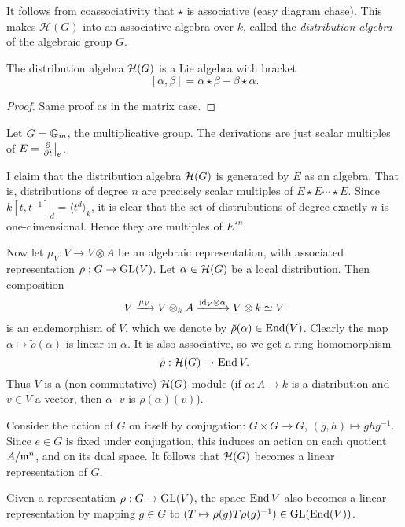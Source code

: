 \documentclass[11pt, english]{article}
\begin{document}
It follows from coassociativity that $\star$ is associative (easy diagram chase). This makes $\mathcal H(G)$ into an associative algebra over $k$, called the \emph{distribution algebra} of the algebraic group $G$.

\begin{prop}
 The distribution algebra $\mathcal{H}(G)$ is a Lie algebra with bracket
\[
[\alpha,\beta] = \alpha \star \beta - \beta \star \alpha.
\]
\end{prop}
\begin{proof}
Same proof as in the matrix case.
\end{proof}

\begin{example}
Let $G = \mathbb{G}_m$, the multiplicative group. The derivations are just scalar multiples of $E=\restr{\dd{}{t}}{e}$.

I claim that the distribution algebra $\mathcal{H}(G)$ is generated by $E$ as an algebra. That is, distributions of degree $n$ are precisely scalar multiples of $E \star E \cdots  \star E$. Since $k[t,t^{-1}]_d= \langle t^{d} \rangle_k$, it is clear that the set of distrubutions of degree exactly $n$ is one-dimensional. Hence they are multiples of $E^{\star n}$.
\end{example}



Now let $\mu_V: V \to V \otimes A$ be an algebraic representation, with associated representation $\rho:G \to \operatorname{GL}(V)$. Let $\alpha \in \mathcal{H}(G)$ be a local distribution. Then composition
\[
V \xrightarrow{\mu_V} V \otimes_k A \xrightarrow{\text{id}_V \otimes \alpha} V \otimes k \simeq V
\]
is an endemorphism of $V$, which we denote by $\tilde \rho(\alpha)\in \operatorname{End}(V)$. Clearly the map $\alpha \mapsto \tilde \rho (\alpha)$ is linear in $\alpha$. It is also associative, so we get a ring homomorphism
\begin{equation}
\label{tilde}
\tilde \rho: \mathcal{H}(G) \to \operatorname{End} V.
\end{equation}
Thus $V$ is a (non-commutative) $\mathcal{H}(G)$-module (if $\alpha:A \to k$ is a distribution and $v \in V$ a vector, then $\alpha \cdot v$ is $\tilde \rho(\alpha)(v)$).

Consider the action of $G$ on itself by conjugation: $G \times G \to G$, $(g,h) \mapsto  ghg^{-1}$. Since $e \in G$ is fixed under conjugation, this induces an action on each quotient $A/\mathfrak{m}^n$, and on its dual space. It follows that $\mathcal{H}(G)$ becomes a linear representation of $G$.

Given a representation $\rho:G \to \operatorname{GL}(V)$, the space $\operatorname{End} V$ also becomes a linear representation by mapping $g \in G$ to $(T \mapsto \rho(g) T \rho(g)^{-1}) \in \operatorname{GL}(\operatorname{End}(V))$.
\end{document}
